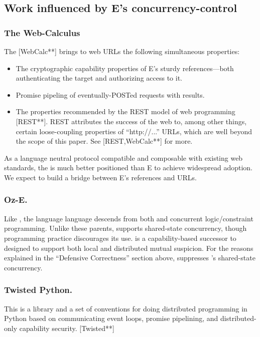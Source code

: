 \documentclass{llncs}
\begin{document}
\subsection{Work influenced by E's concurrency-control}

\subsubsection{The Web-Calculus} The  [WebCalc**]
brings to web URLs the following simultaneous properties:
%
\begin{itemize}
\item The cryptographic capability properties of E's sturdy
  references---both authenticating the target and authorizing access
  to it.
\item Promise pipeling of eventually-POSTed requests with results.
\item The properties recommended by the REST model of web programming
  [REST**]. REST attributes the success of the web to, among other
  things, certain loose-coupling properties of ``http://...''  URLs,
  which are well beyond the scope of this paper. See [REST,WebCalc**]
  for more.
\end{itemize}
%
As a language neutral protocol compatible and composable with existing
web standards, the  is much better positioned than E
to achieve widespread adoption. We expect to build a bridge between
E's references and  URLs.

\subsubsection{Oz-E.} Like , the  language
\cite{VanRoyHaridi} language descends from both  and
concurrent logic/constraint programming. Unlike these parents,
 supports shared-state concurrency, though 
programming practice discourages its use.  \cite{oze} is a
capability-based successor to  designed to support both local
and distributed mutual suspicion. For the reasons explained in the
``Defensive Correctness'' section above,  suppresses
's shared-state concurrency.

\subsubsection{Twisted Python.} This is a library and a set of
conventions for doing distributed programming in Python based on
communicating event loops, promise pipelining, and distributed-only
capability security. [Twisted**]
\end{document}
